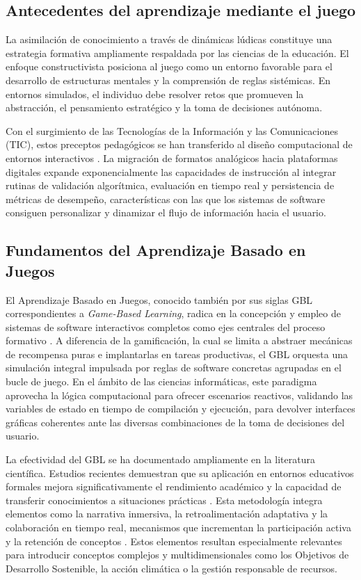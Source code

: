 \subsection{Antecedentes del aprendizaje mediante el juego}
\label{subsec:antecedentes_juego}

La asimilación de conocimiento a través de dinámicas lúdicas constituye una estrategia formativa ampliamente respaldada por las ciencias de la educación. El enfoque constructivista posiciona al juego como un entorno favorable para el desarrollo de estructuras mentales y la comprensión de reglas sistémicas. En entornos simulados, el individuo debe resolver retos que promueven la abstracción, el pensamiento estratégico y la toma de decisiones autónoma.

Con el surgimiento de las Tecnologías de la Información y las Comunicaciones (TIC), estos preceptos pedagógicos se han transferido al diseño computacional de entornos interactivos \parencite{AguileraRoock2022}. La migración de formatos analógicos hacia plataformas digitales expande exponencialmente las capacidades de instrucción al integrar rutinas de validación algorítmica, evaluación en tiempo real y persistencia de métricas de desempeño, características con las que los sistemas de software consiguen personalizar y dinamizar el flujo de información hacia el usuario.


\subsection{Fundamentos del Aprendizaje Basado en Juegos}
\label{subsec:gbl}

El Aprendizaje Basado en Juegos, conocido también por sus siglas GBL correspondientes a \textit{Game-Based Learning}, radica en la concepción y empleo de sistemas de software interactivos completos como ejes centrales del proceso formativo \parencite{PlassHomer2020}. A diferencia de la gamificación, la cual se limita a abstraer mecánicas de recompensa puras e implantarlas en tareas productivas, el GBL orquesta una simulación integral impulsada por reglas de software concretas agrupadas en el bucle de juego. En el ámbito de las ciencias informáticas, este paradigma aprovecha la lógica computacional para ofrecer escenarios reactivos, validando las variables de estado en tiempo de compilación y ejecución, para devolver interfaces gráficas coherentes ante las diversas combinaciones de la toma de decisiones del usuario.

La efectividad del GBL se ha documentado ampliamente en la literatura científica. Estudios recientes demuestran que su aplicación en entornos educativos formales mejora significativamente el rendimiento académico y la capacidad de transferir conocimientos a situaciones prácticas \parencite[p.~15]{AguileraRoock2022}. Esta metodología integra elementos como la narrativa inmersiva, la retroalimentación adaptativa y la colaboración en tiempo real, mecanismos que incrementan la participación activa y la retención de conceptos \parencite{Mabalay2025}. Estos elementos resultan especialmente relevantes para introducir conceptos complejos y multidimensionales como los Objetivos de Desarrollo Sostenible, la acción climática o la gestión responsable de recursos.

